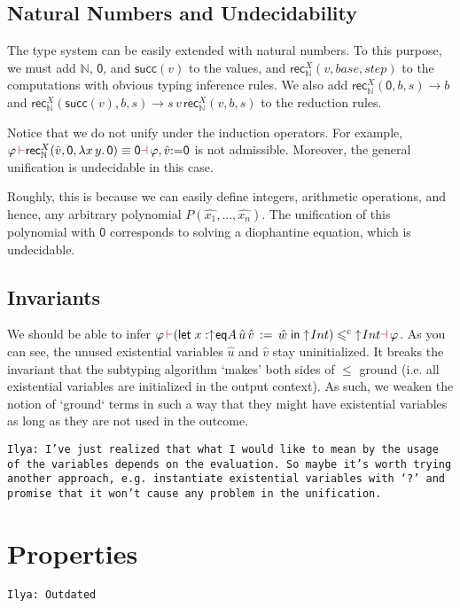 \documentclass[a4,natbib=false]{article}
\newcommand{\ilyam}[1]{{\color{red} \texttt{Ilya:  #1}}}
\newcommand{\fun}[2]{\lambda {#1}.\,{#2}}
\newcommand{\letval}[3]{\mathsf{let}\; {#1} \,:=\, {#2} \;\mathsf{in}\; {#3}}
\newcommand{\valtocomp}[1]{\uparrow \hspace{-2pt} #1}
\newcommand{\eqtype}[3]{\mathsf{eq}{#1}\,{#2}\,{#3}}
\newcommand{\csubt}{\leqslant^c}
\newcommand{\evarassign}[2]{{#1} \mathsf{:=} {#2}}
\newcommand{\reduces}[2]{{#1} \rightarrow {#2}}
\newcommand{\nattype}{\mathbb{N}}
\newcommand{\natzero}{\mathsf{0}}
\newcommand{\natsucc}[1]{\mathsf{succ}({#1})}
\newcommand{\recnat}[4]{\mathsf{rec}_{\nattype}^{#2}({#1},{#3},{#4})}
\newcommand{\judgeacsubt}[4]{{#1}\,{\color{purple}\vdash} {#2} \csubt {#3} {\color{purple}\dashv}\,{#4}}
\newcommand{\judgeaequiv}[4]{{#1}\,{\color{purple}\vdash} {#2} \equiv {#3} {\color{purple}\dashv}\,{#4}}
\begin{document}
\subsection{Natural Numbers and Undecidability}

The type system can be easily extended with natural numbers. To this purpose, we
must add $\nattype$, $\natzero$, and $\natsucc{v}$ to the values, and
$\recnat{v}{X}{base}{step}$ to the computations with obvious typing inference
rules.
We also add $\reduces{\recnat{\natzero}{X}{b}{s}}{b}$ and
$\reduces{\recnat{\natsucc{v}}{X}{b}{s}}{s \, v \, \recnat{v}{X}{b}{s}}$ to the reduction rules.

Notice that we do not unify under the induction operators. For example,
$\judgeaequiv{\varphi}{\recnat{\hat{v}}{X}{\natzero}{\fun{x\,y}{\natzero}}}{\natzero}{\varphi, \evarassign{\hat{v}}{\natzero}}$
is not admissible.
Moreover, the general unification is undecidable in this case.

Roughly, this is because we can easily define integers,
arithmetic operations, and hence, any arbitrary polynomial
$P(\hat{x_1}, \dots, \hat{x_n})$.
The unification of this polynomial with $\natzero$
corresponds to solving a diophantine equation, which is undecidable.

\subsection{Invariants}

We should be able to infer
$\judgeacsubt{\varphi}{(\letval{x:\valtocomp{\eqtype{A}{\hat{u}}{\hat{v}}}}{\hat{w}}{\valtocomp{Int}})}{\valtocomp{Int}}{\varphi}$.
As you can see, the unused existential variables $\hat{u}$ and $\hat{v}$ stay uninitialized.
It breaks the invariant that the subtyping algorithm `makes' both sides of $\leqslant$ ground (i.e. all existential variables are initialized in the output context).
As such, we weaken the notion of `ground` terms in such a way that they might have existential variables as long as they are not used in the outcome.

\ilyam{I've just realized that what I would like to mean by the usage of the variables depends on the evaluation. So maybe it's worth trying another approach,
  e.g. instantiate existential variables with `?' and promise that it won't cause any problem in the unification. }


\section{Properties}
\ilyam{Outdated}
\end{document}
